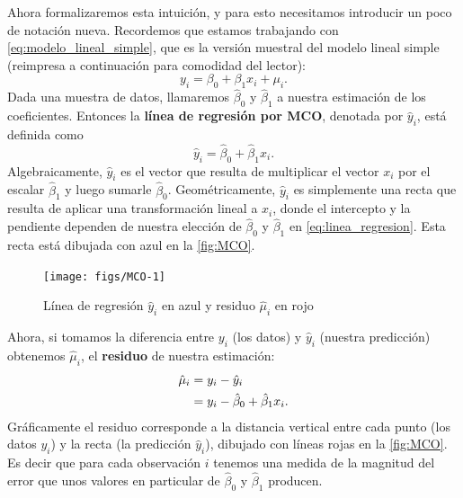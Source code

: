 \documentclass[12pt]{report}\usepackage[]{graphicx}\usepackage[]{color}
\newenvironment{knitrout}{}{} %
\newcommand*{\kw}[1]{\textbf{#1}\index{#1}}
\begin{document}



Ahora formalizaremos esta intuición, y para esto necesitamos introducir un poco de notación nueva.
Recordemos que estamos trabajando con \eqref{eq:modelo_lineal_simple}, que es la versión muestral del modelo lineal simple (reimpresa a continuación para comodidad del lector):
\begin{equation*}
y_i = \beta_0 + \beta_1 x_i + \mu_i.
\end{equation*}
Dada una muestra de datos, llamaremos $\hat\beta_0$ y $\hat\beta_1$ a nuestra estimación de los coeficientes.
Entonces la \kw{línea de regresión por MCO}, denotada por $\hat y_i$, está definida como
\begin{equation}
\hat y_i = \hat\beta_0 + \hat\beta_1 x_i.
\label{eq:linea_regresion}
\end{equation}
Algebraicamente, $\hat y_i$ es el vector que resulta de multiplicar el vector $x_i$ por el escalar $\hat\beta_1$ y luego sumarle $\hat\beta_0$.
Geométricamente, $\hat y_i$ es simplemente una recta que resulta de aplicar una transformación lineal a $x_i$, donde el intercepto y la pendiente dependen de nuestra elección de $\hat\beta_0$ y $\hat\beta_1$ en \eqref{eq:linea_regresion}.
Esta recta está dibujada con azul en la \autoref{fig:MCO}.

\begin{knitrout}
\color{fgcolor}\begin{figure}[htb]

{\centering \texttt{[image: figs/MCO-1]} 

}

\caption[Línea de regresión $\hat y_i$ en azul y residuo $\hat \mu_i$ en rojo]{Línea de regresión $\hat y_i$ en azul y residuo $\hat \mu_i$ en rojo}\label{fig:MCO}
\end{figure}


\end{knitrout}

Ahora, si tomamos la diferencia entre $y_i$ (los datos) y $\hat y_i$ (nuestra predicción) obtenemos $\hat\mu_i$, el \kw{residuo} de nuestra estimación:
\begin{align}
\hat \mu_i &= y_i - \hat y_i \notag \\
           &= y_i - \hat\beta_0 + \hat\beta_1 x_i.
\label{eq:residuos}
\end{align}
Gráficamente el residuo corresponde a la distancia vertical entre cada punto (los datos $y_i$) y la recta (la predicción $\hat y_i$), dibujado con líneas rojas en la \autoref{fig:MCO}.
Es decir que para cada observación $i$ tenemos una medida de la magnitud del error que unos valores en particular de $\hat\beta_0$ y $\hat\beta_1$ producen.
\end{document}
